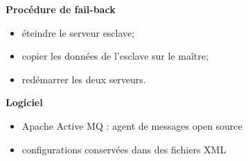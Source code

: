 \begin{frame}
\begin{block}{\textbf{Procédure de fail-back}}
\begin{itemize}
	\item éteindre le serveur esclave;
	\item copier les données de l'esclave sur le maître;
	\item redémarrer les deux serveurs.
\end{itemize} 
\end{block}
\begin{block}{\textbf{Logiciel}}
\begin{itemize}
	\item Apache Active MQ : agent de messages open source
	\item configurations conservées dans des fichiers XML
\end{itemize} 
\end{block}
\end{frame}
